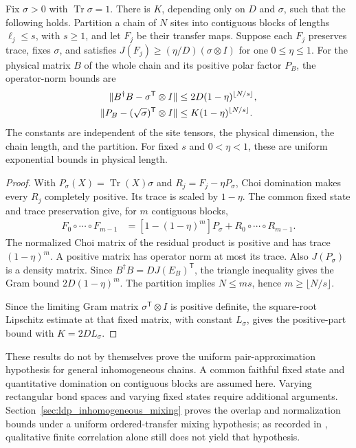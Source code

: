 \begin{lemma}
    \label{thm:ldp_chain_positive_part_rate}
    \leanok
    Fix $\sigma>0$ with $\operatorname{Tr}\sigma=1$. There is $K$, depending
    only on $D$ and $\sigma$, such that the following holds. Partition a chain
    of $N$ sites into contiguous blocks of lengths $\ell_j\le s$, with
    $s\ge1$, and let $F_j$ be their transfer maps. Suppose each $F_j$ preserves
    trace, fixes $\sigma$, and satisfies
    $J(F_j)\ge(\eta/D)(\sigma\otimes I)$ for one $0\le\eta\le1$.
    For the physical matrix $B$ of the whole chain and its positive polar
    factor $P_B$, the operator-norm bounds are
    \begin{align}
        \lVert B^\dagger B-\sigma^\mathsf{T}\otimes I\rVert
         & \le 2D(1-\eta)^{\lfloor N/s\rfloor},\notag \\
        \lVert P_B-(\sqrt\sigma)^\mathsf{T}\otimes I\rVert
         & \le K(1-\eta)^{\lfloor N/s\rfloor}.
    \end{align}
    The constants are independent of the site tensors, the physical
    dimension, the chain length, and the partition. For fixed $s$ and
    $0<\eta<1$, these are uniform exponential bounds in physical length.
\end{lemma}
\begin{proof}\leanok
    With $P_\sigma(X)=\operatorname{Tr}(X)\sigma$ and
    $R_j=F_j-\eta P_\sigma$, Choi domination makes every $R_j$ completely
    positive. Its trace is scaled by $1-\eta$. The common fixed state and
    trace preservation give, for $m$ contiguous blocks,
    \begin{align}
        F_0\circ\cdots\circ F_{m-1}
         & =[1-(1-\eta)^m]P_\sigma+R_0\circ\cdots\circ R_{m-1}.
    \end{align}
    The normalized Choi matrix of the residual product is positive and
    has trace $(1-\eta)^m$. A positive matrix has operator norm at most its
    trace. Also $J(P_\sigma)$ is a density matrix. Since
    $B^\dagger B=D J(E_B)^\mathsf{T}$, the triangle inequality gives the Gram
    bound $2D(1-\eta)^m$. The partition implies $N\le ms$, hence
    $m\ge\lfloor N/s\rfloor$.

    Since the limiting Gram matrix $\sigma^\mathsf{T}\otimes I$ is positive
    definite, the square-root Lipschitz estimate at that fixed
    matrix, with constant $L_\sigma$, gives the positive-part bound with
    $K=2DL_\sigma$.
\end{proof}

These results do not by themselves prove the uniform pair-approximation
hypothesis for general inhomogeneous chains. A common faithful fixed state
and quantitative domination on contiguous blocks are assumed here.
Varying rectangular bond spaces and varying fixed states require additional
arguments. Section~\ref{sec:ldp_inhomogeneous_mixing} proves the overlap and
normalization bounds under a uniform ordered-transfer mixing hypothesis; as
recorded in \cite{gap:mswc24_inhomogeneous_scope}, qualitative finite
correlation alone still does not yield that hypothesis.
